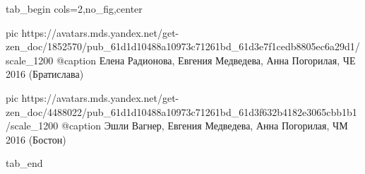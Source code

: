  
 
 
 
 


\ifcmt
  tab_begin cols=2,no_fig,center

     pic https://avatars.mds.yandex.net/get-zen_doc/1852570/pub_61d1d10488a10973c71261bd_61d3e7f1cedb8805ec6a29d1/scale_1200
		 @caption Елена Радионова, Евгения Медведева, Анна Погорилая, ЧЕ 2016 (Братислава)

		 pic https://avatars.mds.yandex.net/get-zen_doc/4488022/pub_61d1d10488a10973c71261bd_61d3f632b4182e3065cbb1b1/scale_1200
		 @caption Эшли Вагнер, Евгения Медведева, Анна Погорилая, ЧМ 2016 (Бостон)

  tab_end
\fi
